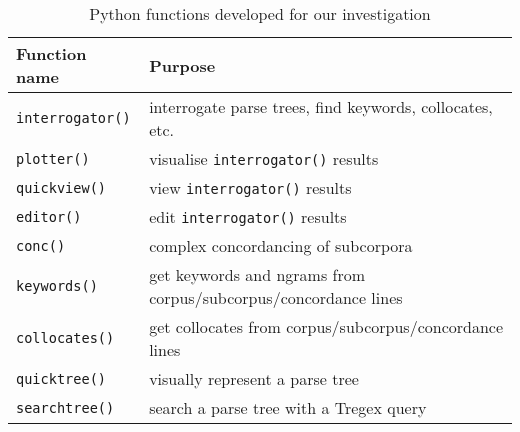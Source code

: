 \begin{table}[h!]
\small
\centering
\begin{tabularx}{0.5\textwidth}{|l|X|} \hline

\textbf{Function name} &  \textbf{Purpose}     \\ \hline
\texttt{interrogator()}  &  interrogate parse trees, find keywords, collocates, etc.    \\ \hline
\texttt{plotter()}       &  visualise \texttt{interrogator()} results  \\ \hline
\texttt{quickview()}     &  view \texttt{interrogator()} results       \\ \hline
\texttt{editor()}       &  edit \texttt{interrogator()} results       \\ \hline
\texttt{conc()}          &  complex concordancing of subcorpora  \\ \hline
\texttt{keywords()}          &  get keywords and ngrams from corpus\slash subcorpus\slash concordance lines  \\ \hline
\texttt{collocates()}          &  get collocates from corpus\slash subcorpus\slash concordance lines \\ \hline
\texttt{quicktree()}          &  visually represent a parse tree  \\ \hline
\texttt{searchtree()}          &  search a parse tree with a Tregex query  \\ \hline
\end{tabularx}
\caption{Python functions developed for our investigation}
\label{tab:pyfunc}
\end{table}

